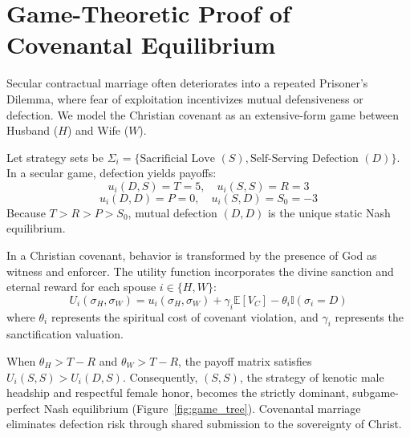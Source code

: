 \documentclass[11pt,twocolumn]{article}
\begin{document}
\section{Game-Theoretic Proof of Covenantal Equilibrium}

Secular contractual marriage often deteriorates into a repeated Prisoner's Dilemma, where fear of exploitation incentivizes mutual defensiveness or defection. We model the Christian covenant as an extensive-form game between Husband ($H$) and Wife ($W$).

Let strategy sets be $\Sigma_i = \{\text{Sacrificial Love } (S), \text{Self-Serving Defection } (D)\}$. In a secular game, defection yields payoffs:
\begin{equation}
    u_i(D, S) = T = 5, \quad u_i(S, S) = R = 3
\end{equation}
\begin{equation}
    u_i(D, D) = P = 0, \quad u_i(S, D) = S_0 = -3
\end{equation}
Because $T > R > P > S_0$, mutual defection $(D,D)$ is the unique static Nash equilibrium.

In a Christian covenant, behavior is transformed by the presence of God as witness and enforcer. The utility function incorporates the divine sanction and eternal reward for each spouse $i \in \{H, W\}$:
\begin{equation}
    U_i(\sigma_H, \sigma_W) = u_i(\sigma_H, \sigma_W) + \gamma_i \mathbb{E}[V_C] - \theta_i \mathbb{I}(\sigma_i = D)
\end{equation}
where $\theta_i$ represents the spiritual cost of covenant violation, and $\gamma_i$ represents the sanctification valuation.

When $\theta_H > T - R$ and $\theta_W > T - R$, the payoff matrix satisfies $U_i(S, S) > U_i(D, S)$. Consequently, $(S,S)$, the strategy of kenotic male headship and respectful female honor, becomes the strictly dominant, subgame-perfect Nash equilibrium (Figure~\ref{fig:game_tree}). Covenantal marriage eliminates defection risk through shared submission to the sovereignty of Christ.
\end{document}
